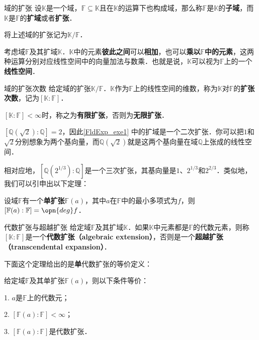\begin{definition}{域的扩张}
设$\mathbb{K}$是一个域，$\mathbb{F}\subseteq \mathbb{K}$且在$\mathbb{K}$的运算下也构成域，那么称$\mathbb{F}$是$\mathbb{K}$的\textbf{子域}，而$\mathbb{K}$是$\mathbb{F}$的\textbf{扩域}或者\textbf{扩张}．

将上述域的扩张记为$\mathbb{K}/\mathbb{F}$．
\end{definition}

考虑域$\mathbb{F}$及其扩域$\mathbb{K}$．$\mathbb{K}$中的元素\textbf{彼此之间}可以\textbf{相加}，也可以\textbf{乘以}$\mathbb{F}$\textbf{中的元素}，这两种运算分别对应线性空间中的向量加法与数乘．也就是说，$\mathbb{K}$可以视为$\mathbb{F}$上的一个\textbf{线性空间}．

\begin{definition}{域的扩张次数}
给定域的扩张$\mathbb{K}/\mathbb{F}$．$\mathbb{K}$作为$\mathbb{F}$上的线性空间的维数，称为$\mathbb{K}$对$\mathbb{F}$的\textbf{扩张次数}，记为$[\mathbb{K}:\mathbb{F}]$．

$[\mathbb{K}:\mathbb{F}]<\infty$时，称之为\textbf{有限扩张}，否则为\textbf{无限扩张}．
\end{definition}

$[\mathbb{Q}(\sqrt{2}):\mathbb{Q}]=2$，因此\autoref{FldExp_exe1} 中的扩域是一个二次扩张．你可以把$1$和$\sqrt{2}$分别想象为两个基向量，而$\mathbb{Q}(\sqrt{2})$就是这两个基向量在域$\mathbb{Q}$上张成的线性空间．

相对应地，$[\mathbb{Q}(2^{1/3}):\mathbb{Q}]$是一个三次扩张，其基向量是$1$、$2^{1/3}$和$2^{2/3}$．类似地，我们可以引申出以下定理：




\begin{theorem}{}\label{FldExp_the1}
设域$\mathbb{F}$有一个\textbf{单扩张}$\mathbb{F}(a)$，其中$a$在$\mathbb{F}$中的最小多项式为$f$，则$[\mathbb{F}(a):\mathbb{F}]=\opn{deg}f$．
\end{theorem}




\begin{definition}{代数扩张与超越扩张}\label{FldExp_def3}
给定域$\mathbb{F}$及其扩域$\mathbb{K}$．如果$\mathbb{K}$中元素都是$\mathbb{F}$的代数元素，则称$[\mathbb{K}:\mathbb{F}]$是一个\textbf{代数扩张（algebraic extension）}，否则是一个\textbf{超越扩张（transcendental expansion）}．
\end{definition}

下面这个定理给出的是\textbf{单}代数扩张的等价定义：

\begin{theorem}{}\label{FldExp_the2}
给定域$\mathbb{F}$及其单扩张$\mathbb{F}(a)$，则以下条件等价：

1. $a$是$\mathbb{F}$上的代数元；

2. $[\mathbb{F}(a):\mathbb{F}]<\infty$；

3. $[\mathbb{F}(a):\mathbb{F}]$是代数扩张．

\end{theorem}



